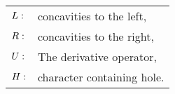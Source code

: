 \begin{Symbols}
	
	\begin{longtable}{m{3cm}   m{12cm}}
		\($$L:$$\) & concavities to the left,\\
		\($$R:$$\) & concavities to the right, \\
		\($$U:$$\) & The derivative operator,\\
		\($$H:$$\) &  character containing hole.\\
	\end{longtable}
	
\end{Symbols}